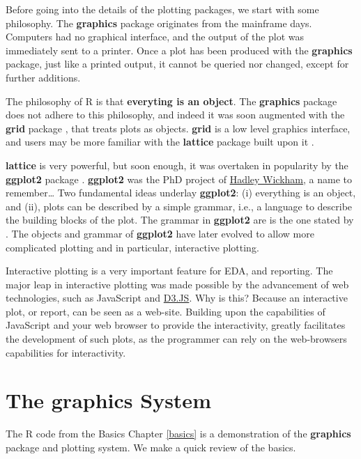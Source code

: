 \documentclass[]{book}
\theoremstyle{definition}
\theoremstyle{definition}
\theoremstyle{definition}
\theoremstyle{remark}
\begin{document}
Before going into the details of the plotting packages, we start with
some philosophy. The \textbf{graphics} package originates from the
mainframe days. Computers had no graphical interface, and the output of
the plot was immediately sent to a printer. Once a plot has been
produced with the \textbf{graphics} package, just like a printed output,
it cannot be queried nor changed, except for further additions.

The philosophy of R is that \textbf{everyting is an object}. The
\textbf{graphics} package does not adhere to this philosophy, and indeed
it was soon augmented with the \textbf{grid} package \citep{Rlanguage},
that treats plots as objects. \textbf{grid} is a low level graphics
interface, and users may be more familiar with the \textbf{lattice}
package built upon it \citep{lattice}.

\textbf{lattice} is very powerful, but soon enough, it was overtaken in
popularity by the \textbf{ggplot2} package \citep{ggplot2}.
\textbf{ggplot2} was the PhD project of \href{http://hadley.nz/}{Hadley
Wickham}, a name to remember\ldots{} Two fundamental ideas underlay
\textbf{ggplot2}: (i) everything is an object, and (ii), plots can be
described by a simple grammar, i.e., a language to describe the building
blocks of the plot. The grammar in \textbf{ggplot2} are is the one
stated by \citet{wilkinson2006grammar}. The objects and grammar of
\textbf{ggplot2} have later evolved to allow more complicated plotting
and in particular, interactive plotting.

Interactive plotting is a very important feature for EDA, and reporting.
The major leap in interactive plotting was made possible by the
advancement of web technologies, such as JavaScript and
\href{https://en.wikipedia.org/wiki/D3.js}{D3.JS}. Why is this? Because
an interactive plot, or report, can be seen as a web-site. Building upon
the capabilities of JavaScript and your web browser to provide the
interactivity, greatly facilitates the development of such plots, as the
programmer can rely on the web-browsers capabilities for interactivity.

\section{The graphics System}\label{the-graphics-system}

The R code from the Basics Chapter \ref{basics} is a demonstration of
the \textbf{graphics} package and plotting system. We make a quick
review of the basics.
\end{document}

